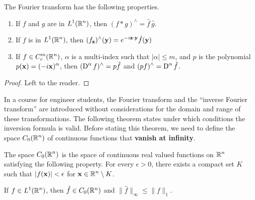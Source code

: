 
The Fourier transform has the following properties.

\begin{prop} \label{FTLofPs}
\begin{enumerate}
\item If $f$ and $g$ are in $\displaystyle L^1(\mathbb{R}^n)$, then
$\displaystyle (f\ast g)^\wedge = \hat{f}\,\hat{g}$.
\item If $f$ is in $\displaystyle L^1(\mathbb{R}^n)$, then
$\displaystyle (f_{\mathbf{z}})^\wedge(\mathbf{y}) =
e^{-i \mathbf{z}\cdot\mathbf{y}} \hat{f}(\mathbf{y})$
\item If $\displaystyle f \in C_c^m(\mathbb{R}^n)$, $\alpha$ is a multi-index
such that $|\alpha|\leq m$, and $p$ is the polynomial
$\displaystyle p(\mathbf{x}) = (-i\mathbf{x})^\alpha$,
then $\displaystyle (\operatorname{D}^\alpha f)^\wedge = p \hat{f}$ and
$\displaystyle (p f)^\wedge = \operatorname{D}^\alpha\hat{f}$.
\end{enumerate}
\end{prop}

\begin{proof}
Left to the reader.
\end{proof}

In a course for engineer students, the Fourier transform and the
``inverse Fourier transform'' are introduced without considerations
for the domain and range of these transformations.  The following
theorem states under which conditions the inversion formula is valid.
Before stating this theorem, we need to define the space
$\displaystyle C_0(\mathbb{R}^n)$ of continuous functions that
{\bfseries vanish at infinity}.

The space $\displaystyle C_0(\mathbb{R}^n)$ is the space of continuous real valued
functions on $\displaystyle \mathbb{R}^n$ satisfying the following property.  For every
$\epsilon >0$, there exists a compact set $K$ such that
$|f(\mathbf{x})|<\epsilon$ for $\displaystyle \mathbf{x} \in \mathbb{R}^n \setminus K$.

\begin{prop} \label{distr_C0_four_transf}
If $\displaystyle f\in L^1(\mathbb{R}^n)$, then $\hat{f} \in C_0(\mathbb{R}^n)$ and
$\|\hat{f}\|_\infty \leq \|f\|_1$.
\end{prop}

